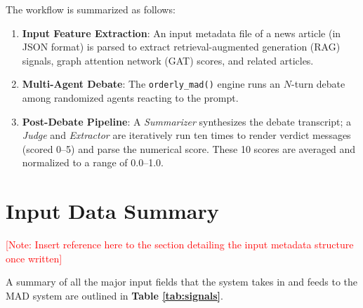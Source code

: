 \documentclass[sigconf,nonacm]{acmart}
\begin{document}
The workflow is summarized as follows:
\begin{enumerate}
    \item \textbf{Input Feature Extraction}: An input metadata file of a news article (in JSON format) is parsed to extract retrieval-augmented generation (RAG) signals, graph attention network (GAT) scores, and related articles.
    \item \textbf{Multi-Agent Debate}: The \texttt{orderly\_mad()} engine runs an $N$-turn debate among randomized agents reacting to the prompt.
    \item \textbf{Post-Debate Pipeline}: A \textit{Summarizer} synthesizes the debate transcript; a \textit{Judge} and \textit{Extractor} are iteratively run ten times to render verdict messages (scored 0--5) and parse the numerical score. These 10 scores are averaged and normalized to a range of 0.0--1.0.
\end{enumerate}

\section{Input Data Summary}\label{sec:input_data}

\textcolor{red}{[Note: Insert reference here to the section detailing the input metadata structure once written]}

A summary of all the major input fields that the system takes in and feeds to the MAD system are outlined in \textbf{Table \ref{tab:signals}}.

\begin{table}[h]
    \centering
    \caption{Summary of Input Processed Signals}
    \label{tab:signals}
\end{table}
\end{document}
